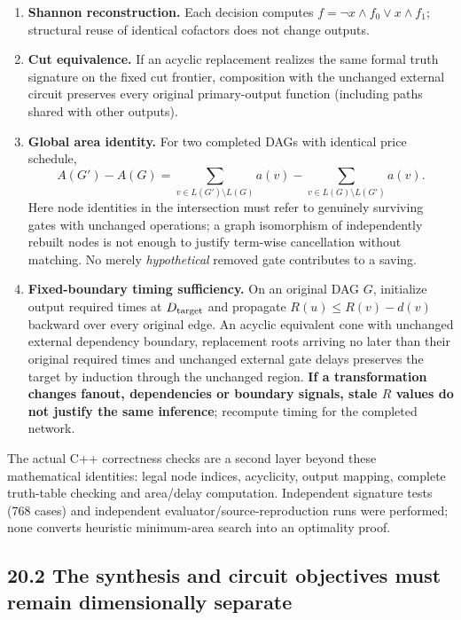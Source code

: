 \begin{enumerate}
\def\labelenumi{\arabic{enumi}.}
\tightlist
\item
  \textbf{Shannon reconstruction.} Each decision computes \(f=\neg x\land f_0\lor x\land f_1\); structural reuse of identical cofactors does not change outputs.
\item
  \textbf{Cut equivalence.} If an acyclic replacement realizes the same formal truth signature on the fixed cut frontier, composition with the unchanged external circuit preserves every original primary-output function (including paths shared with other outputs).
\item
  \textbf{Global area identity.} For two completed DAGs with identical price schedule, \[
  A(G')-A(G)=\sum_{v\in L(G')\setminus L(G)}a(v)
      -\sum_{v\in L(G)\setminus L(G')}a(v).
  \] Here node identities in the intersection must refer to genuinely surviving gates with unchanged operations; a graph isomorphism of independently rebuilt nodes is not enough to justify term-wise cancellation without matching. No merely \emph{hypothetical} removed gate contributes to a saving.
\item
  \textbf{Fixed-boundary timing sufficiency.} On an original DAG \(G\), initialize output required times at \(D_{\rm target}\) and propagate \(R(u)\le R(v)-d(v)\) backward over every original edge. An acyclic equivalent cone with unchanged external dependency boundary, replacement roots arriving no later than their original required times and unchanged external gate delays preserves the target by induction through the unchanged region. \textbf{If a transformation changes fanout, dependencies or boundary signals, stale \(R\) values do not justify the same inference}; recompute timing for the completed network.
\end{enumerate}

The actual C++ correctness checks are a second layer beyond these mathematical identities: legal node indices, acyclicity, output mapping, complete truth-table checking and area/delay computation. Independent signature tests (768 cases) and independent evaluator/source-reproduction runs were performed; none converts heuristic minimum-area search into an optimality proof.

\subsection{20.2 The synthesis and circuit objectives must remain dimensionally separate}\label{the-synthesis-and-circuit-objectives-must-remain-dimensionally-separate}

